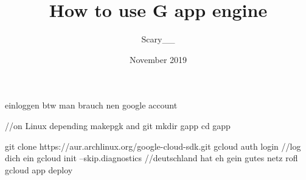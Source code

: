 \documentclass{article}
\title{How to use G app engine}
\author{Scary\_\_ }
\date{November 2019}
\begin{document}
einloggen btw
man brauch nen google account

//on Linux depending makepgk and git
mkdir gapp
cd gapp

git clone https://aur.archlinux.org/google-cloud-sdk.git
gcloud auth login
//log dich ein
gcloud init --skip.diagnostics //deutschland hat eh gein gutes netz rofl
gcloud app deploy

\maketitle
\end{document}
